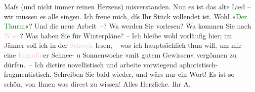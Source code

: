                Maſs (und nicht immer reinen Herzens) misverstanden. Nun es ist das alte Lied – wir
               müssen es alle singen. Ich freue mich, dſs Ihr Stück vollendet ist. Wohl »\textcolor{green}{Der Thurm}{}\ledrightnote{\textcolor{green}{Der Turm. Ein Trauerspiel}}«? Und die neue Arbeit –? Wa{\geminationn} werden Sie vorlesen? Wa{\geminationn}
               kommen Sie nach \textcolor{pink}{Wien}{}\ledrightnote{\textcolor{pink}{Wien}}? Was haben Sie für Winterpläne?
               – Ich bleibe wohl vorläufig hier; im Jänner{ }soll {\pb}ich in der \textcolor{pink}{Schweiz}{}\ledrightnote{\textcolor{pink}{Schweiz}} lesen, – was ich hauptsächlich thun will,
               um mir eine \textcolor{pink}{Engadin}{}\ledrightnote{\textcolor{pink}{Engadin}}er Schnee- u Sonnenwoche \strikeout{\textcolor{gray}{ver}} »mit gutem Gewissen« vergönnen
               zu dürfen. – Ich dictire novellistisch und arbeite vorwiegend
               aphoristisch-fragmentistisch. Schreiben Sie bald wieder, und wärs nur ein Wort! Es
               ist so schön, von Ihnen was direct zu wissen! \pend
           \pstart
           Alles Herzliche. Ihr \spacefill\mbox{A.}\pend
           \endnumbering{}  
      